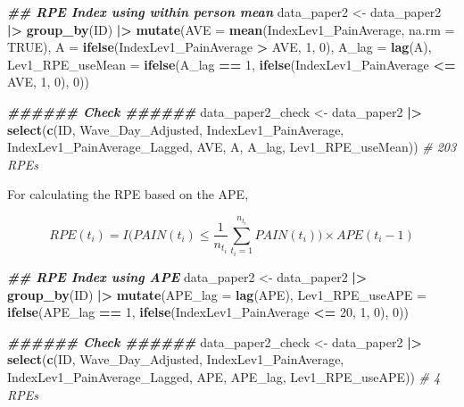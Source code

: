 \documentclass[
  12pt,
]{article}
\newenvironment{Shaded}{\begin{snugshade}}{\end{snugshade}}
\newcommand{\AttributeTok}[1]{\textcolor[rgb]{0.13,0.29,0.53}{#1}}
\newcommand{\CommentTok}[1]{\textcolor[rgb]{0.56,0.35,0.01}{\textit{#1}}}
\newcommand{\ConstantTok}[1]{\textcolor[rgb]{0.56,0.35,0.01}{#1}}
\newcommand{\DecValTok}[1]{\textcolor[rgb]{0.00,0.00,0.81}{#1}}
\newcommand{\DocumentationTok}[1]{\textcolor[rgb]{0.56,0.35,0.01}{\textbf{\textit{#1}}}}
\newcommand{\FunctionTok}[1]{\textcolor[rgb]{0.13,0.29,0.53}{\textbf{#1}}}
\newcommand{\NormalTok}[1]{#1}
\newcommand{\OtherTok}[1]{\textcolor[rgb]{0.56,0.35,0.01}{#1}}
\newcommand{\SpecialCharTok}[1]{\textcolor[rgb]{0.81,0.36,0.00}{\textbf{#1}}}
\begin{document}
\begin{Shaded}
\begin{Highlighting}[]
\DocumentationTok{\#\# RPE Index using within person mean}
\NormalTok{data\_paper2 }\OtherTok{\textless{}{-}}\NormalTok{ data\_paper2 }\SpecialCharTok{|\textgreater{}}
  \FunctionTok{group\_by}\NormalTok{(ID) }\SpecialCharTok{|\textgreater{}}
  \FunctionTok{mutate}\NormalTok{(}\AttributeTok{AVE =} \FunctionTok{mean}\NormalTok{(IndexLev1\_PainAverage, }\AttributeTok{na.rm =} \ConstantTok{TRUE}\NormalTok{),}
         \AttributeTok{A =} \FunctionTok{ifelse}\NormalTok{(IndexLev1\_PainAverage }\SpecialCharTok{\textgreater{}}\NormalTok{ AVE, }\DecValTok{1}\NormalTok{, }\DecValTok{0}\NormalTok{),}
         \AttributeTok{A\_lag =} \FunctionTok{lag}\NormalTok{(A),}
         \AttributeTok{Lev1\_RPE\_useMean =} \FunctionTok{ifelse}\NormalTok{(A\_lag }\SpecialCharTok{==} \DecValTok{1}\NormalTok{, }
                                   \FunctionTok{ifelse}\NormalTok{(IndexLev1\_PainAverage }\SpecialCharTok{\textless{}=}\NormalTok{ AVE, }\DecValTok{1}\NormalTok{, }\DecValTok{0}\NormalTok{), }\DecValTok{0}\NormalTok{)) }

\DocumentationTok{\#\#\#\#\#\# Check \#\#\#\#\#\#}
\NormalTok{data\_paper2\_check }\OtherTok{\textless{}{-}}\NormalTok{ data\_paper2 }\SpecialCharTok{|\textgreater{}}
  \FunctionTok{select}\NormalTok{(}\FunctionTok{c}\NormalTok{(ID, Wave\_Day\_Adjusted, IndexLev1\_PainAverage, IndexLev1\_PainAverage\_Lagged, }
\NormalTok{           AVE, A, A\_lag, Lev1\_RPE\_useMean))}
\CommentTok{\# 203 RPEs}
\end{Highlighting}
\end{Shaded}

For calculating the RPE based on the APE,

\[
RPE(t_i)=I\Big(PAIN(t_i)\leq \frac{1}{n_{t_i}}\sum_{t_i=1}^{n_{t_i}}PAIN(t_i)\Big)\times APE(t_i-1)
\]

\begin{Shaded}
\begin{Highlighting}[]
\DocumentationTok{\#\# RPE Index using APE}
\NormalTok{data\_paper2 }\OtherTok{\textless{}{-}}\NormalTok{ data\_paper2 }\SpecialCharTok{|\textgreater{}}
  \FunctionTok{group\_by}\NormalTok{(ID) }\SpecialCharTok{|\textgreater{}}
  \FunctionTok{mutate}\NormalTok{(}\AttributeTok{APE\_lag =} \FunctionTok{lag}\NormalTok{(APE), }
         \AttributeTok{Lev1\_RPE\_useAPE =} \FunctionTok{ifelse}\NormalTok{(APE\_lag }\SpecialCharTok{==} \DecValTok{1}\NormalTok{, }
                                   \FunctionTok{ifelse}\NormalTok{(IndexLev1\_PainAverage }\SpecialCharTok{\textless{}=} \DecValTok{20}\NormalTok{, }\DecValTok{1}\NormalTok{, }\DecValTok{0}\NormalTok{), }\DecValTok{0}\NormalTok{)) }

\DocumentationTok{\#\#\#\#\#\# Check \#\#\#\#\#\#}
\NormalTok{data\_paper2\_check }\OtherTok{\textless{}{-}}\NormalTok{ data\_paper2 }\SpecialCharTok{|\textgreater{}}
  \FunctionTok{select}\NormalTok{(}\FunctionTok{c}\NormalTok{(ID, Wave\_Day\_Adjusted, IndexLev1\_PainAverage, IndexLev1\_PainAverage\_Lagged, }
\NormalTok{           APE, APE\_lag, Lev1\_RPE\_useAPE))}
\CommentTok{\# 4 RPEs}
\end{Highlighting}
\end{Shaded}
\end{document}
